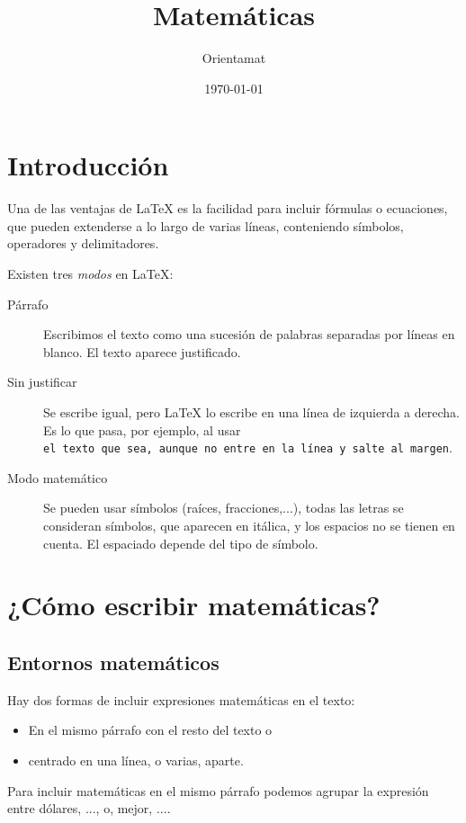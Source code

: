 \documentclass{article}
\title{Matemáticas} %
\author{Orientamat} %
\date{\today} %
\numberwithin{equation}{section}
\theoremstyle{plain}
\theoremstyle{definition}
\theoremstyle{remark}
\begin{document}
\maketitle

\tableofcontents

\bigskip

\section{Introducción}

Una de las ventajas de \LaTeX{} es la facilidad para incluir fórmulas o ecuaciones, que pueden extenderse a lo largo de varias líneas, conteniendo símbolos, operadores y delimitadores.

Existen tres \emph{modos} en \LaTeX:
\begin{description}
    \item[Párrafo] Escribimos el texto como una sucesión de palabras separadas por líneas en blanco. El texto aparece justificado.
    \item[Sin justificar] Se escribe igual, pero \LaTeX{} lo escribe en una línea de izquierda a derecha. Es lo que pasa, por ejemplo, al usar \texttt{\mbox{el texto que sea, aunque no entre en la línea y salte al margen}}.
    \item[Modo matemático] Se pueden usar símbolos (raíces, fracciones,...), todas las letras se consideran símbolos, que aparecen en itálica, y los espacios no se tienen en cuenta. El espaciado depende del tipo de símbolo.
\end{description}


\section{¿Cómo escribir matemáticas?}

\subsection{Entornos matemáticos}

Hay dos formas de incluir expresiones matemáticas en el texto:
\begin{itemize}
    \item En el mismo párrafo con el resto del texto o
    \item centrado en una línea, o varias, aparte.
\end{itemize}

Para incluir matemáticas en el mismo párrafo podemos agrupar la expresión entre dólares, \texttt{$...$}, o, mejor, \texttt{\(...\)}.
\end{document}
